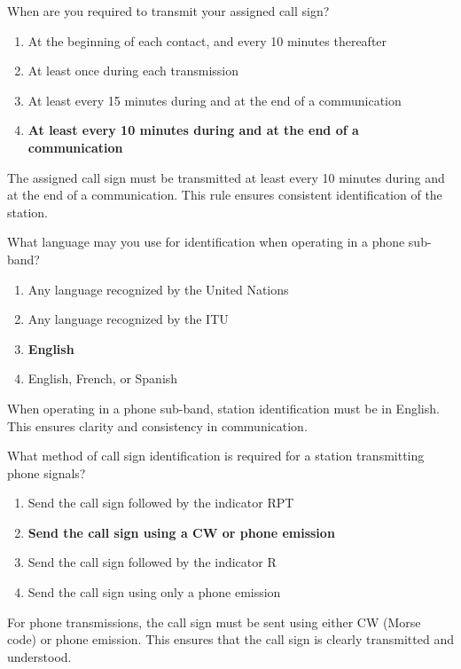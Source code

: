 \begin{tcolorbox}[colback=gray!10!white,colframe=black!75!black,title={T1F03}]
    When are you required to transmit your assigned call sign?
    \begin{enumerate}[label=\Alph*),noitemsep]
        \item At the beginning of each contact, and every 10 minutes thereafter
        \item At least once during each transmission
        \item At least every 15 minutes during and at the end of a communication
        \item \textbf{At least every 10 minutes during and at the end of a communication}
    \end{enumerate}
\end{tcolorbox}
The assigned call sign must be transmitted at least every 10 minutes during and at the end of a communication. This rule ensures consistent identification of the station.


\begin{tcolorbox}[colback=gray!10!white,colframe=black!75!black,title={T1F04}]
    What language may you use for identification when operating in a phone sub-band?
    \begin{enumerate}[label=\Alph*),noitemsep]
        \item Any language recognized by the United Nations
        \item Any language recognized by the ITU
        \item \textbf{English}
        \item English, French, or Spanish
    \end{enumerate}
\end{tcolorbox}
When operating in a phone sub-band, station identification must be in English. This ensures clarity and consistency in communication.


\begin{tcolorbox}[colback=gray!10!white,colframe=black!75!black,title={T1F05}]
    What method of call sign identification is required for a station transmitting phone signals?
    \begin{enumerate}[label=\Alph*),noitemsep]
        \item Send the call sign followed by the indicator RPT
        \item \textbf{Send the call sign using a CW or phone emission}
        \item Send the call sign followed by the indicator R
        \item Send the call sign using only a phone emission
    \end{enumerate}
\end{tcolorbox}
For phone transmissions, the call sign must be sent using either CW (Morse code) or phone emission. This ensures that the call sign is clearly transmitted and understood.

